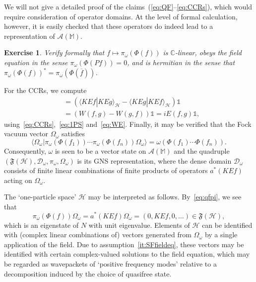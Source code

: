 \documentclass[12pt]{article}
\newcommand{\1}{\mathds{1}}                         %
\newcommand{\CC}{\mathbb{C}}           %
\newcommand{\MM}{\mathbb{M}}
\newcommand{\FF}{{\mathfrak{F}}}
\newcommand{\HH}{{\mathcal{H}}}
\newcommand{\DD}{{\mathscr{D}}}
\newcommand{\II}{{\mathbb{1}}}
\newcommand{\Ac}{{\mathcal{A}}}
\newcommand{\ip}[2]{\langle #1|#2\rangle}
\newtheorem{exercise}[theorem]{Exercise}
\begin{document}
We will not give a detailed proof of the claims~(\ref{eq:QF}--\ref{eq:CCRs}), which would require consideration of operator domains.
At the level of formal calculation, however, it is easily checked that these operators do indeed lead to a representation of $\Ac(\MM)$.
\begin{exercise} Verify formally that $f\mapsto \pi_\omega(\Phi(f))$ is $\CC$-linear, obeys the field equation in the sense $\pi_\omega(\Phi(Pf))=0$, and is hermitian in the sense that $\pi_\omega(\Phi(f))^*=\pi_\omega(\Phi(\overline{f}))$.
\end{exercise}
For the CCRs, we compute
\begin{align*}
[\pi_\omega(\Phi(f)),\pi_\omega(\Phi(g))] &= \left(\ip{KEf}{KEg}_\HH - \ip{KEg}{KEf}_\HH\right)\II\\
&= \left(W(f,g)-W(g,f)\right)\II = iE(f,g)\II,
\end{align*}
using~\eqref{eq:CCRs},~\eqref{eq:1PS} and~\eqref{eq:WE}. Finally, 
it may be verified that the Fock vacuum vector $\Omega_\omega$ satisfies
\[
\ip{\Omega_\omega}{\pi_\omega(\Phi(f_1))\cdots \pi_\omega(\Phi(f_n))\Omega_\omega} = \omega(\Phi(f_1)\cdots \Phi(f_n)).
\]
Consequently, $\omega$ is seen to be a vector state on $\Ac(\MM)$ 
and the quadruple $(\FF(\HH), \DD_\omega,\pi_\omega,\Omega_\omega)$ is its GNS representation, where
the dense domain $\DD_\omega$ consists of finite linear combinations of finite products of operators $a^*(KEf)$ acting on $\Omega_\omega$.

The `one-particle space' $\HH$ may be interpreted as follows.  By~\eqref{eq:qfpi}, we see that
\[
\pi_\omega(\Phi(f))\Omega_\omega = a^*(KEf)\Omega_\omega = (0,KEf,0,\ldots)\in\FF(\HH) ,
\]
which is an eigenstate of $N$ with unit eigenvalue. Elements of $\HH$ can be identified with (complex linear combinations of) vectors generated from $\Omega_\omega$ by a single application of the field. Due to assumption~\ref{it:SFfieldeq}, these vectors may be identified with certain complex-valued solutions to the field equation, which may be regarded as wavepackets of `positive frequency modes' relative to a decomposition induced by the choice of quasifree state. 
\end{document}
